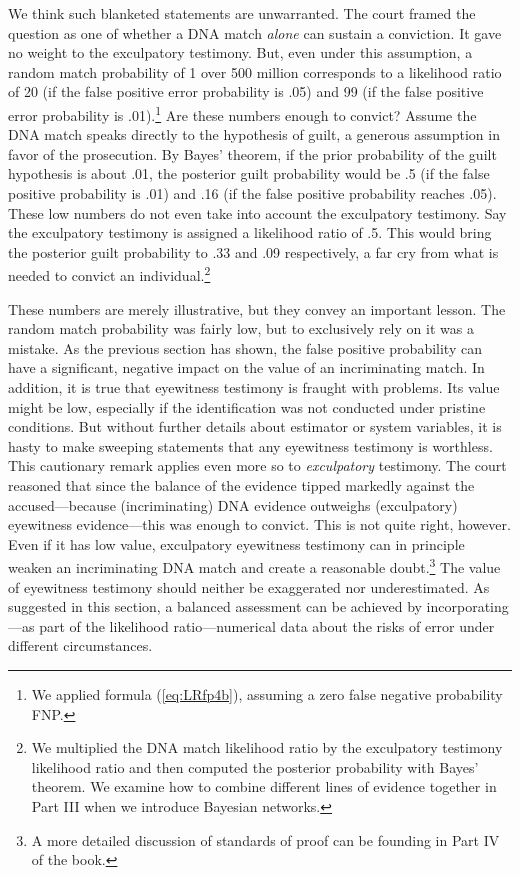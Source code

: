 \documentclass[
  letterpaper,
  DIV=11,
  numbers=noendperiod]{scrartcl}
\begin{document}
We think such blanketed statements are unwarranted. The court framed the
question as one of whether a DNA match \textit{alone} can sustain a
conviction. It gave no weight to the exculpatory testimony. But, even
under this assumption, a random match probability of 1 over 500 million
corresponds to a likelihood ratio of 20 (if the false positive error
probability is .05) and 99 (if the false positive error probability is
.01).\footnote{We applied formula (\ref{eq:LRfp4b}), assuming a zero
  false negative probability FNP.} Are these numbers enough to convict?
Assume the DNA match speaks directly to the hypothesis of guilt, a
generous assumption in favor of the prosecution. By Bayes' theorem, if
the prior probability of the guilt hypothesis is about .01, the
posterior guilt probability would be .5 (if the false positive
probability is .01) and .16 (if the false positive probability reaches
.05). These low numbers do not even take into account the exculpatory
testimony. Say the exculpatory testimony is assigned a likelihood ratio
of .5. This would bring the posterior guilt probability to .33 and .09
respectively, a far cry from what is needed to convict an
individual.\footnote{We multiplied the DNA match likelihood ratio by the
  exculpatory testimony likelihood ratio and then computed the posterior
  probability with Bayes' theorem. We examine how to combine different
  lines of evidence together in Part III when we introduce Bayesian
  networks.} 

These numbers are merely illustrative, but they convey an important
lesson. The random match probability was fairly low, but to exclusively
rely on it was a mistake. As the previous section has shown, the false
positive probability can have a significant, negative impact on the
value of an incriminating match. In addition, it is true that eyewitness
testimony is fraught with problems. Its value might be low, especially
if the identification was not conducted under pristine conditions. But
without further details about estimator or system variables, it is hasty
to make sweeping statements that any eyewitness testimony is worthless.
This cautionary remark applies even more so to \textit{exculpatory}
testimony. The court reasoned that since the balance of the evidence
tipped markedly against the accused---because (incriminating) DNA
evidence outweighs (exculpatory) eyewitness evidence---this was enough
to convict. This is not quite right, however. Even if it has low value,
exculpatory eyewitness testimony can in principle weaken an
incriminating DNA match and create a reasonable doubt.\footnote{A more
  detailed discussion of standards of proof can be founding in Part IV
  of the book.} The value of eyewitness testimony should neither be
exaggerated nor underestimated. As suggested in this section, a balanced
assessment can be achieved by incorporating---as part of the likelihood
ratio---numerical data about the risks of error under different
circumstances.
\end{document}
